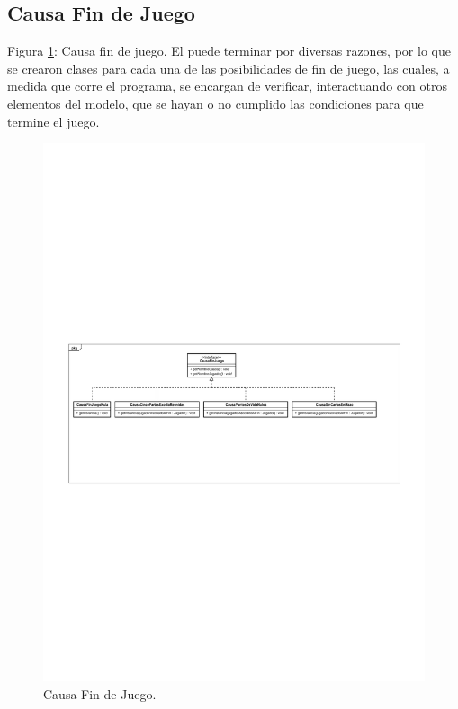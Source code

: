 	\subsection{Causa Fin de Juego}
	
	Figura \ref{class_CausaFinJuego}: Causa fin de juego. El  puede terminar por diversas razones, por lo que se crearon clases para cada una de las posibilidades de fin de juego, las cuales, a medida que corre el programa, se encargan de verificar, interactuando con otros elementos del modelo, que se hayan o no cumplido las condiciones para que termine el juego.
	
	\begin{figure}[H]
		\centering
		\includegraphics[scale=0.8]{includes/class_CausaFinJuego}
		\caption{Causa Fin de Juego.}
		\label{class_CausaFinJuego}
	\end{figure}
	
